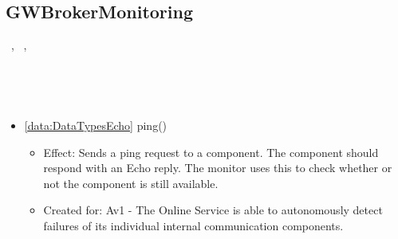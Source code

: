   \subsection{GWBrokerMonitoring}\label{int:OnlineServiceOnlineServiceGatewayBrokerGWBrokerMonitoring}
    \begin{description}
      \item[Provided by:] \iconcomponent{}~, \iconcomponent{}~, \iconcomponent{}~
      \item[Required by:] \iconcomponent{}~
      \item[Operations:] ~
    \begin{itemize}[noitemsep,nolistsep,leftmargin=-.25cm]
      \item \textsf{\ref{data:DataTypesEcho} ping()}
        \begin{itemize}[noitemsep,nolistsep]
           \item Effect: Sends a ping request to a component. The component should respond with an Echo reply. The monitor uses this to check whether or not the component is still available.
\item Created for: Av1 - The Online Service is able to autonomously detect failures of its individual internal communication components.
        \end{itemize}
    \end{itemize}
    \end{description}

